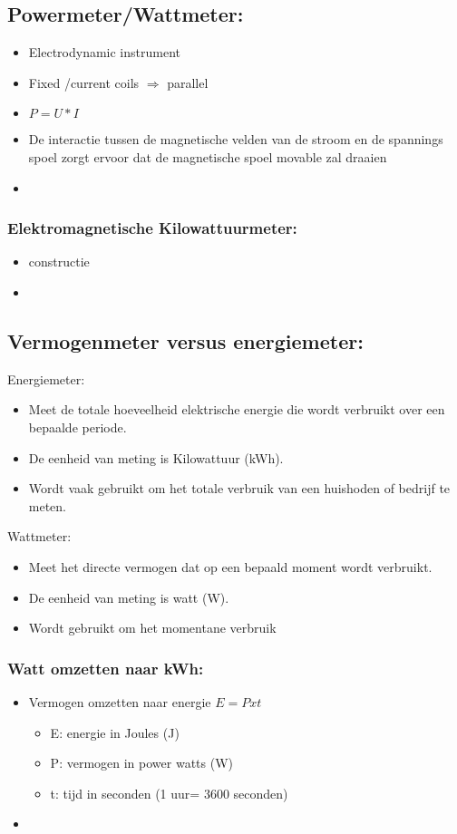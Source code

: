 \documentclass[12pt]{article}
\begin{document}
\subsection{Powermeter/Wattmeter:}
\begin{itemize}
    \item Electrodynamic instrument
    \item Fixed /current coils $\Rightarrow$ parallel 
    \item $P=U*I$
    \item De interactie tussen de magnetische velden van de stroom en de spannings spoel zorgt ervoor dat de magnetische spoel movable zal draaien
    \item 
\end{itemize}
\subsubsection{Elektromagnetische Kilowattuurmeter:}
\begin{itemize}
    \item constructie
    \item 
\end{itemize}
\subsection{Vermogenmeter versus energiemeter:}
Energiemeter:
\begin{itemize}
    \item Meet de totale hoeveelheid elektrische energie die wordt verbruikt over een bepaalde periode.
    \item De eenheid van meting is Kilowattuur (kWh).
    \item Wordt vaak gebruikt om het totale verbruik van een huishoden of bedrijf te meten.
\end{itemize}
Wattmeter:
\begin{itemize}
    \item Meet het directe vermogen dat op een bepaald moment wordt verbruikt.
    \item De eenheid van meting is watt (W).
    \item Wordt gebruikt om het momentane verbruik
\end{itemize}
\subsubsection{Watt omzetten naar kWh:}
\begin{itemize}
    \item Vermogen omzetten naar energie $E=Pxt$\begin{itemize}
        \item E: energie in Joules (J)
        \item P: vermogen in power watts (W)
        \item t: tijd in seconden (1 uur= 3600 seconden)
    \end{itemize}
    \item[] %
\end{itemize}
\end{document}
